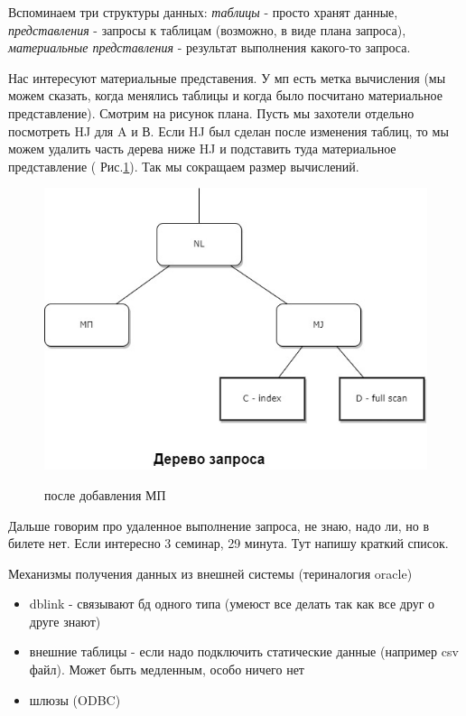 Вспоминаем три структуры данных: \textit{таблицы} - просто хранят данные, \textit{представления} - запросы к таблицам (возможно, в виде плана запроса), \textit{материальные представления} - результат выполнения какого-то запроса. 

Нас интересуют материальные представения. У мп есть метка вычисления (мы можем сказать, когда менялись таблицы и когда было посчитано материальное представление). Смотрим на рисунок плана. Пусть мы захотели отдельно посмотреть HJ для A и В. Если HJ был сделан после изменения таблиц, то мы можем удалить часть дерева ниже HJ и подставить туда материальное представление ( Рис.\ref{fig:plan2}). Так мы сокращаем размер вычислений.  

\begin{figure}[H]
	\centering
	\includegraphics[scale = 0.5]{5/plan2.jpg}
	\label{fig:plan2}
	\caption{после добавления МП}
\end{figure}

\color{blue} Дальше говорим про удаленное выполнение запроса, не знаю, надо ли, но в билете нет. Если интересно 3 семинар, 29 минута. Тут напишу краткий список. 
\color{black}

Механизмы получения данных из внешней системы (териналогия  oracle)
\begin{itemize}
	\item  dblink -  связывают бд одного типа (умеюст все делать так как все друг о друге знают)
	\item внешние таблицы - если надо подключить статические данные (например csv файл). Может быть медленным, особо ничего нет
	\item шлюзы (ODBC) 
\end{itemize}